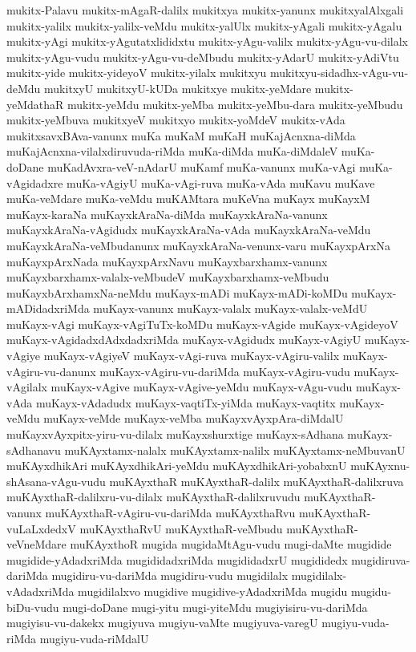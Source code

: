 {mukitx-Palavu
mukitx-mAgaR-dalilx
mukitxya
mukitx-yanunx
mukitxyalAlxgali
mukitx-yalilx
mukitx-yalilx-veMdu
mukitx-yalUlx
mukitx-yAgali
mukitx-yAgalu
mukitx-yAgi
mukitx-yAgutatxlididxtu
mukitx-yAgu-valilx
mukitx-yAgu-vu-dilalx
mukitx-yAgu-vudu
mukitx-yAgu-vu-deMbudu
mukitx-yAdarU
mukitx-yAdiVtu
mukitx-yide
mukitx-yideyoV
mukitx-yilalx
mukitxyu
mukitxyu-sidadhx-vAgu-vu-deMdu
mukitxyU
mukitxyU-kUDa
mukitxye
mukitx-yeMdare
mukitx-yeMdathaR
mukitx-yeMdu
mukitx-yeMba
mukitx-yeMbu-dara
mukitx-yeMbudu
mukitx-yeMbuva
mukitxyeV
mukitxyo
mukitx-yoMdeV
mukitx-vAda
mukitxsavxBAva-vanunx
muKa
muKaM
muKaH
muKajAcnxna-diMda
muKajAcnxna-vilalxdiruvuda-riMda
muKa-diMda
muKa-diMdaleV
muKa-doDane
muKadAvxra-veV-nAdarU
muKamf
muKa-vanunx
muKa-vAgi
muKa-vAgidadxre
muKa-vAgiyU
muKa-vAgi-ruva
muKa-vAda
muKavu
muKave
muKa-veMdare
muKa-veMdu
muKAMtara
muKeVna
muKayx
muKayxM
muKayx-karaNa
muKayxkAraNa-diMda
muKayxkAraNa-vanunx
muKayxkAraNa-vAgidudx
muKayxkAraNa-vAda
muKayxkAraNa-veMdu
muKayxkAraNa-veMbudanunx
muKayxkAraNa-venunx-varu
muKayxpArxNa
muKayxpArxNada
muKayxpArxNavu
muKayxbarxhamx-vanunx
muKayxbarxhamx-valalx-veMbudeV
muKayxbarxhamx-veMbudu
muKayxbArxhamxNa-neMdu
muKayx-mADi
muKayx-mADi-koMDu
muKayx-mADidadxriMda
muKayx-vanunx
muKayx-valalx
muKayx-valalx-veMdU
muKayx-vAgi
muKayx-vAgiTuTx-koMDu
muKayx-vAgide
muKayx-vAgideyoV
muKayx-vAgidadxdAdxdadxriMda
muKayx-vAgidudx
muKayx-vAgiyU
muKayx-vAgiye
muKayx-vAgiyeV
muKayx-vAgi-ruva
muKayx-vAgiru-valilx
muKayx-vAgiru-vu-danunx
muKayx-vAgiru-vu-dariMda
muKayx-vAgiru-vudu
muKayx-vAgilalx
muKayx-vAgive
muKayx-vAgive-yeMdu
muKayx-vAgu-vudu
muKayx-vAda
muKayx-vAdadudx
muKayx-vaqtiTx-yiMda
muKayx-vaqtitx
muKayx-veMdu
muKayx-veMde
muKayx-veMba
muKayxvAyxpAra-diMdalU
muKayxvAyxpitx-yiru-vu-dilalx
muKayxshurxtige
muKayx-sAdhana
muKayx-sAdhanavu
muKAyxtamx-nalalx
muKAyxtamx-nalilx
muKAyxtamx-neMbuvanU
muKAyxdhikAri
muKAyxdhikAri-yeMdu
muKAyxdhikAri-yobabxnU
muKAyxnu-shAsana-vAgu-vudu
muKAyxthaR
muKAyxthaR-dalilx
muKAyxthaR-dalilxruva
muKAyxthaR-dalilxru-vu-dilalx
muKAyxthaR-dalilxruvudu
muKAyxthaR-vanunx
muKAyxthaR-vAgiru-vu-dariMda
muKAyxthaRvu
muKAyxthaR-vuLaLxdedxV
muKAyxthaRvU
muKAyxthaR-veMbudu
muKAyxthaR-veVneMdare
muKAyxthoR
mugida
mugidaMtAgu-vudu
mugi-daMte
mugidide
mugidide-yAdadxriMda
mugididadxriMda
mugididadxrU
mugididedx
mugidiruva-dariMda
mugidiru-vu-dariMda
mugidiru-vudu
mugidilalx
mugidilalx-vAdadxriMda
mugidilalxvo
mugidive
mugidive-yAdadxriMda
mugidu
mugidu-biDu-vudu
mugi-doDane
mugi-yitu
mugi-yiteMdu
mugiyisiru-vu-dariMda
mugiyisu-vu-dakekx
mugiyuva
mugiyu-vaMte
mugiyuva-varegU
mugiyu-vuda-riMda
mugiyu-vuda-riMdalU
}
